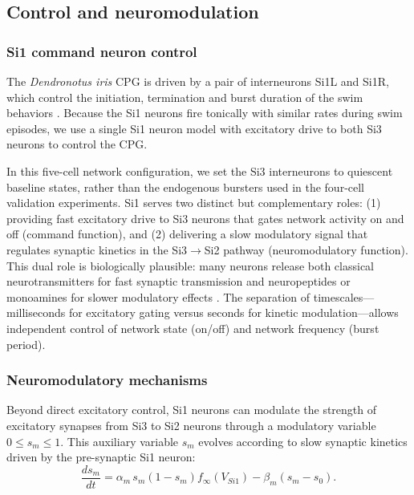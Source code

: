 \documentclass[nofootinbib,aip,amsmath,amssymb,preprint,twocolumn,floatfix,10pt]{revtex4-2}
\begin{document}
\subsection{Control and neuromodulation}

\subsubsection{Si1 command neuron control}

The {\em Dendronotus iris} CPG is driven by a pair of interneurons Si1L and Si1R, which control the initiation, termination and burst duration of the swim behaviors \cite{sakurai2019command, SakuraiKatz2016}. Because the Si1 neurons fire tonically with similar rates during swim episodes, we use a single Si1 neuron model with excitatory drive to both Si3 neurons to control the CPG.

In this five-cell network configuration, we set the Si3 interneurons to quiescent baseline states, rather than the endogenous bursters used in the four-cell validation experiments. Si1 serves two distinct but complementary roles: (1) providing fast excitatory drive to Si3 neurons that gates network activity on and off (command function), and (2) delivering a slow modulatory signal that regulates synaptic kinetics in the Si3$\to$Si2 pathway (neuromodulatory function). This dual role is biologically plausible: many neurons release both classical neurotransmitters for fast synaptic transmission and neuropeptides or monoamines for slower modulatory effects \cite{MarderBucher2001, NadimBucher2014}. The separation of timescales---milliseconds for excitatory gating versus seconds for kinetic modulation---allows independent control of network state (on/off) and network frequency (burst period).

\subsubsection{Neuromodulatory mechanisms}

Beyond direct excitatory control, Si1 neurons can modulate the strength of excitatory synapses from Si3 to Si2 neurons through a modulatory variable $0 \le s_m \le 1$. This auxiliary variable $s_m$ evolves according to slow synaptic kinetics driven by the pre-synaptic Si1 neuron:
\begin{equation}
\frac{ds_m}{dt} = \alpha_m\, s_m (1 - s_m) f_{\infty}(V_{Si1}) - \beta_m (s_m - s_0).
\end{equation}
\end{document}
